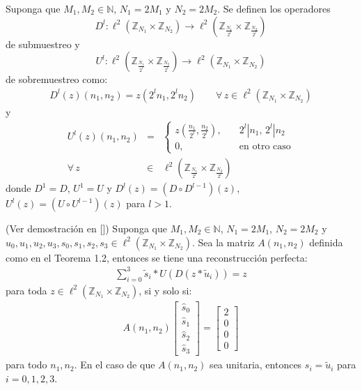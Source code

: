 \begin{definition}
Suponga que $M_1,M_2\in\mathbb{N}$, $N_1=2M_1$ y $N_2=2M_2$. Se definen los operadores $$D^l:\ell^2(\mathbb{Z}_{N_1}\times\mathbb{Z}_{N_2})\rightarrow\ell^2(\mathbb{Z}_{\frac{N_1}{2^l}}\times\mathbb{Z}_{\frac{N_2}{2^l}})$$ de submuestreo y $$U^l:\ell^2(\mathbb{Z}_{\frac{N_1}{2^l}}\times\mathbb{Z}_{\frac{N_2}{2^l}})\rightarrow\ell^2(\mathbb{Z}_{N_1}\times\mathbb{Z}_{N_2})$$ de sobremuestreo como:
\begin{eqnarray}
D^l(z)(n_1,n_2)=z(2^ln_1,2^ln_2)\qquad\forall\,z\in\ell^2(\mathbb{Z}_{N_1}\times\mathbb{Z}_{N_2})\nonumber
\end{eqnarray}
y
\begin{eqnarray}
U^l(z)(n_1,n_2)&=&\left\{\begin{array}{rr}
z\left(\frac{n_1}{2^l},\frac{n_2}{2^l}\right),&\quad 2^l | n_1,\, 2^l|n_2\\
0,&\quad\mbox{en otro caso}
\end{array}\right.\nonumber\\
\forall\,z&\in &\ell^2(\mathbb{Z}_{\frac{N_1}{2^l}}\times\mathbb{Z}_{\frac{N_2}{2^l}})\nonumber
\end{eqnarray}
donde $D^1=D$, $U^1=U$ y $D^l(z)=(D\circ D^{l-1})(z)$, $U^l(z)=(U\circ U^{l-1})(z)$ para $l>1$.
\end{definition}

\begin{theorem}
(Ver demostraci\'on en [\textcolor{cyan}{\cite{12}}]) Suponga que $M_1,M_2\in\mathbb{N}$, $N_1=2M_1$, $N_2=2M_2$ y $u_0,u_1,u_2,u_3,s_0,s_1,s_2,s_3\in\ell^2(\mathbb{Z}_{N_1}\times\mathbb{Z}_{N_2})$. Sea la matriz $A(n_1,n_2)$ definida como en el Teorema 1.2, entonces se tiene una reconstrucci\'on perfecta:
\begin{eqnarray}
\sum_{i=0}^3 \tilde{s}_i\ast U(D(z\ast\tilde{u}_i))=z\nonumber
\end{eqnarray}
para toda $z\in\ell^2(\mathbb{Z}_{N_1}\times\mathbb{Z}_{N_2})$, si y solo si:
\begin{eqnarray}
A(n_1,n_2)\left[\begin{array}{c}
\hat{s}_0\\ \hat{s}_1\\ \hat{s}_2\\ \hat{s}_3
\end{array}\right]=\left[\begin{array}{c}
2\\0\\0\\0
\end{array}\right]\nonumber
\end{eqnarray}
para todo $n_1,n_2$. En el caso de que $A(n_1,n_2)$ sea unitaria, entonces $s_i=\tilde{u}_i$ para $i=0,1,2,3$.
\label{reconstruccion-perfecta}
\end{theorem}

